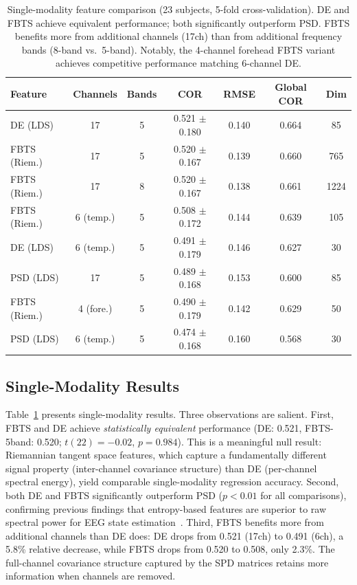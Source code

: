 \documentclass{iopjournal}
\begin{document}
\begin{table}
\caption{Single-modality feature comparison (23 subjects, 5-fold cross-validation). DE and FBTS achieve equivalent performance; both significantly outperform PSD. FBTS benefits more from additional channels (17ch) than from additional frequency bands (8-band vs.\ 5-band). Notably, the 4-channel forehead FBTS variant achieves competitive performance matching 6-channel DE.}
\centering
\begin{tabular}{lcccccc}
\toprule
\textbf{Feature} & \textbf{Channels} & \textbf{Bands} & \textbf{COR} & \textbf{RMSE} & \textbf{Global COR} & \textbf{Dim} \\
\midrule
DE (LDS)     & 17 & 5 & 0.521 $\pm$ 0.180 & 0.140 & 0.664 & 85 \\
FBTS (Riem.) & 17 & 5 & 0.520 $\pm$ 0.167 & 0.139 & 0.660 & 765 \\
FBTS (Riem.) & 17 & 8 & 0.520 $\pm$ 0.167 & 0.138 & 0.661 & 1224 \\
FBTS (Riem.) & 6 (temp.) & 5 & 0.508 $\pm$ 0.172 & 0.144 & 0.639 & 105 \\
DE (LDS)     & 6 (temp.) & 5 & 0.491 $\pm$ 0.179 & 0.146 & 0.627 & 30 \\
PSD (LDS)    & 17 & 5 & 0.489 $\pm$ 0.168 & 0.153 & 0.600 & 85 \\
FBTS (Riem.) & 4 (fore.) & 5 & 0.490 $\pm$ 0.179 & 0.142 & 0.629 & 50 \\
PSD (LDS)    & 6 (temp.) & 5 & 0.474 $\pm$ 0.168 & 0.160 & 0.568 & 30 \\
\bottomrule
\end{tabular}
\label{tab:single}
\end{table}

\subsection{Single-Modality Results}

Table~\ref{tab:single} presents single-modality results. Three observations are salient. First, FBTS and DE achieve \emph{statistically equivalent} performance (DE: 0.521, FBTS-5band: 0.520; $t(22)=-0.02$, $p=0.984$). This is a meaningful null result: Riemannian tangent space features, which capture a fundamentally different signal property (inter-channel covariance structure) than DE (per-channel spectral energy), yield comparable single-modality regression accuracy. Second, both DE and FBTS significantly outperform PSD ($p < 0.01$ for all comparisons), confirming previous findings that entropy-based features are superior to raw spectral power for EEG state estimation~\cite{shi2013differential}. Third, FBTS benefits more from additional channels than DE does: DE drops from 0.521 (17ch) to 0.491 (6ch), a 5.8\% relative decrease, while FBTS drops from 0.520 to 0.508, only 2.3\%. The full-channel covariance structure captured by the SPD matrices retains more information when channels are removed.
\end{document}
